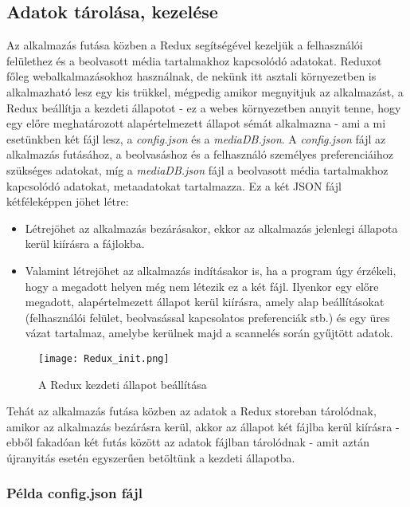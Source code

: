 \subsection{Adatok tárolása, kezelése}
Az alkalmazás futása közben a Redux segítségével kezeljük a felhasználói felülethez és a beolvasott média tartalmakhoz kapcsolódó adatokat. Reduxot főleg webalkalmazásokhoz használnak, de nekünk itt asztali környezetben is alkalmazható lesz egy kis trükkel, mégpedig amikor megnyitjuk az alkalmazást, a Redux beállítja a kezdeti állapotot - ez a webes környezetben annyit tenne, hogy egy előre meghatározott alapértelmezett állapot sémát alkalmazna - ami a mi esetünkben két fájl lesz, a {\it config.json} és a {\it mediaDB.json}. A {\it config.json} fájl az alkalmazás futásához, a beolvasáshoz és a felhasználó személyes preferenciáihoz szükséges adatokat, míg a {\it mediaDB.json} fájl a beolvasott média tartalmakhoz kapcsolódó adatokat, metaadatokat tartalmazza. Ez a két JSON fájl kétféleképpen jöhet létre:
\begin{itemize}
    \item Létrejöhet az alkalmazás bezárásakor, ekkor az alkalmazás jelenlegi állapota kerül kiírásra a fájlokba.
    \item Valamint létrejöhet az alkalmazás indításakor is, ha a program úgy érzékeli, hogy a megadott helyen még nem létezik ez a két fájl. Ilyenkor egy előre megadott, alapértelmezett állapot kerül kiírásra, amely alap beállításokat (felhasználói felület, beolvasással kapcsolatos preferenciák stb.) és egy üres vázat tartalmaz, amelybe kerülnek majd a scannelés során gyűjtött adatok.
\end{itemize}

\begin{figure}[H]
	\centering
	\texttt{[image: Redux\_init.png]}
	\caption{A Redux kezdeti állapot beállítása}
	\label{fig:redux-init}
\end{figure}

Tehát az alkalmazás futása közben az adatok a Redux storeban tárolódnak, amikor az alkalmazás bezárásra kerül, akkor az állapot két fájlba kerül kiírásra - ebből fakadóan két futás között az adatok fájlban tárolódnak - amit aztán újranyitás esetén egyszerűen betöltünk a kezdeti állapotba.

\subsubsection{Példa config.json fájl}

